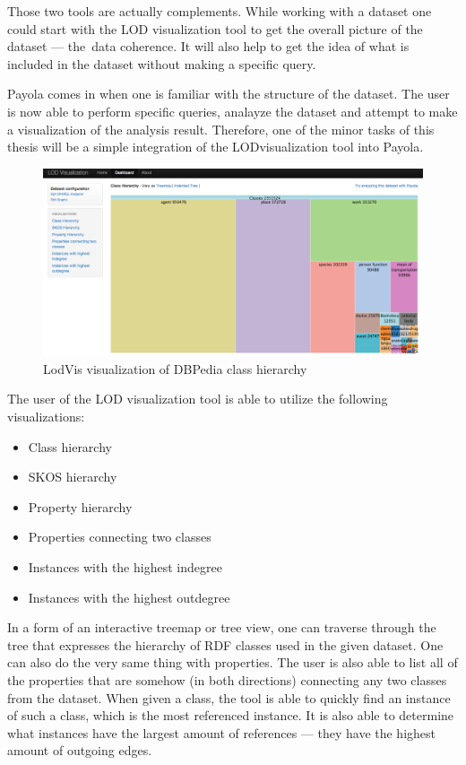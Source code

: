 Those two tools are actually complements. While working with a dataset one could 
start with the LOD visualization tool to get the overall picture of the dataset --- 
the~data coherence. It will also help to get the idea of what is included in the 
dataset without making a specific query.

Payola comes in when one is familiar with the structure of the dataset. The user 
is now able to perform specific queries, analayze the dataset and attempt to make a 
visualization of the analysis result. Therefore, one of the minor tasks of this thesis
will be a simple integration of the LODvisualization tool into Payola.

\begin{figure}
	\centering
	\includegraphics[width=140mm]{img/lodvis.png}
	\caption{LodVis visualization of DBPedia class hierarchy}
	\label{fig:lodvis}
\end{figure}

The user of the LOD visualization tool is able to utilize the following 
visualizations:

\begin{itemize}
\item Class hierarchy
\item SKOS hierarchy
\item Property hierarchy
\item Properties connecting two classes
\item Instances with the highest indegree
\item Instances with the highest outdegree
\end{itemize}

In a form of an interactive treemap or tree view, one 
can traverse through the tree that expresses the hierarchy of RDF classes used 
in the given dataset. One can also do the very same thing with properties. The 
user is also able to list all of the properties that are somehow (in both directions)
connecting any two classes from the dataset. When given a class, the tool is 
able to quickly find an instance of such a class, which is the most referenced
instance. It is also able to determine what instances have the largest amount of references
--- they have the highest amount of outgoing
edges.

